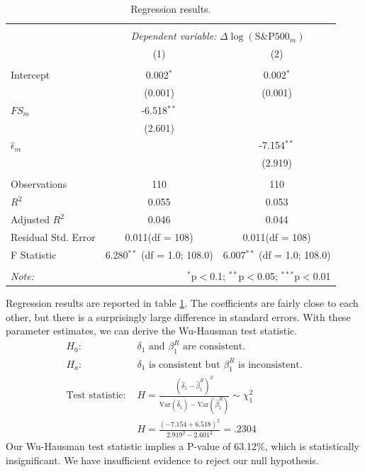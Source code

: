 \documentclass[a4paper,man,floatsintext,natbib]{apa6}
\begin{document}
	\begin{table}[!htbp] \centering
		\begin{tabular}{@{\extracolsep{5pt}}lcc}
			\\[-1.8ex]\hline
			\hline \\[-1.8ex]
			& \multicolumn{2}{c}{\textit{Dependent variable:} \(\Delta \log{(\text{S\&P500}_m)}\)} \
			\cr \cline{2-3}
			\\[-1.8ex] & (1) & (2) \\
			\hline \\[-1.8ex]
			Intercept & 0.002$^{*}$ & 0.002$^{*}$ \\
			& (0.001) & (0.001) \\
			\(FS_m\) & -6.518$^{**}$ & \\
			& (2.601) & \\
			\(\hat{\epsilon}_m\) & & -7.154$^{**}$ \\
			& & (2.919) \\
			\hline \\[-1.8ex]
			Observations & 110 & 110 \\
			$R^2$ & 0.055 & 0.053 \\
			Adjusted $R^2$ & 0.046 & 0.044 \\
			Residual Std. Error & 0.011(df = 108) & 0.011(df = 108)  \\
			F Statistic & 6.280$^{**}$ (df = 1.0; 108.0) & 6.007$^{**}$ (df = 1.0; 108.0) \\
			\hline
			\hline \\[-1.8ex]
			\textit{Note:} & \multicolumn{2}{r}{$^{*}$p$<$0.1; $^{**}$p$<$0.05; $^{***}$p$<$0.01} \\
		\end{tabular}
	\caption{Regression results.}
	\label{finalReg}
	\end{table}

	Regression results are reported in table \ref{finalReg}. The coefficients are fairly close to each other, but there is a surprisingly large difference in standard errors. With these parameter estimates, we can derive the Wu-Hausman test statistic.
	\begin{align*}
		H_0: &\delta_1 \text{ and } \beta_1^R \text{ are consistent.} \\
		H_a: &\delta_1 \text{ is consistent but } \beta_1^R \text{ is inconsistent.} \\
		\text{Test statistic: } &H = \frac{(\hat{\delta}_1-\hat{\beta}_1^R)^2}{\mathrm{Var}(\hat{\delta}_1)-\mathrm{Var}(\hat{\beta}_1^R)} \sim \chi^2_1 \\
		&H = \frac{( -7.154+6.518)^2}{2.919^2- 2.601^2} = .2304
	\end{align*}
	Our Wu-Hausman test statistic implies a P-value of 63.12\%, which is statistically insignificant. We have insufficient evidence to reject our null hypothesis.
\end{document}
